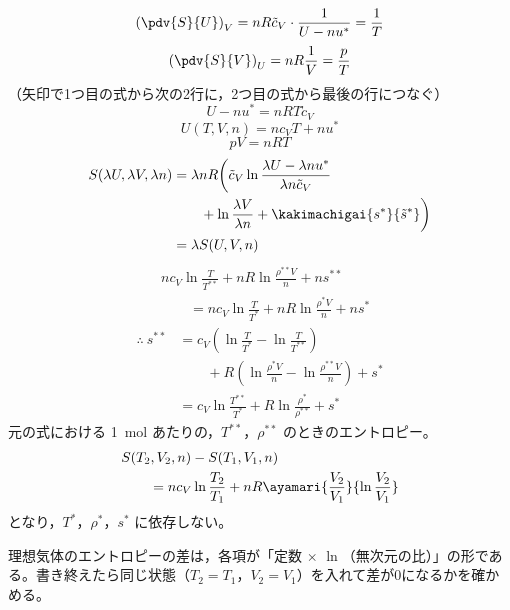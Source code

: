 \[ \left(\pdv{S}{U}\right)_{V}=nR\tilde{c}_{V}\cdot\frac{1}{U-nu^{*}}=\frac{1}{T} \]
\[ \left(\pdv{S}{V}\right)_{U}=nR\frac{1}{V}=\frac{p}{T} \]
（矢印で1つ目の式から次の2行に，2つ目の式から最後の行につなぐ）
\[ U-nu^{*}=nRT\tilde{c}_{V} \]
\[ U(T,V,n)=nc_{V}T+nu^{*} \]
\[ pV=nRT \]
\begin{align*}
S(\lambda U,\lambda V,\lambda n)&=\lambda nR\biggl(\tilde{c}_{V}\ln\frac{\lambda U-\lambda nu^{*}}{\lambda n\tilde{c}_{V}}\\
&\qquad+\ln\frac{\lambda V}{\lambda n}+\kakimachigai{s^{*}}{\tilde{s}^{*}}\biggr)\\
&=\lambda S(U,V,n)
\end{align*}
\begin{align*}
&nc_{V}\ln\frac{T}{T^{**}}+nR\ln\frac{\rho^{**}V}{n}+ns^{**}\\
&\qquad=nc_{V}\ln\frac{T}{T^{*}}+nR\ln\frac{\rho^{*}V}{n}+ns^{*}
\end{align*}
\begin{align*}
\therefore\ s^{**}&=c_{V}\left(\ln\frac{T}{T^{*}}-\ln\frac{T}{T^{**}}\right)\\
&\qquad+R\left(\ln\frac{\rho^{*}V}{n}-\ln\frac{\rho^{**}V}{n}\right)+s^{*}\\
&=c_{V}\ln\frac{T^{**}}{T^{*}}+R\ln\frac{\rho^{*}}{\rho^{**}}+s^{*}
\end{align*}
元の式における \qty{1}{\mole} あたりの，$T^{**}$，$\rho^{**}$ のときのエントロピー。
\begin{align*}
&S(T_{2},V_{2},n)-S(T_{1},V_{1},n)\\
&\qquad=nc_{V}\ln\frac{T_{2}}{T_{1}}+nR\ayamari{\frac{V_{2}}{V_{1}}}{\ln\frac{V_{2}}{V_{1}}}
\end{align*}
となり，$T^{*}$，$\rho^{*}$，$s^{*}$ に依存しない。
\item 理想気体のエントロピーの差は，各項が「定数 $\times$ $\ln$（無次元の比）」の形である。書き終えたら同じ状態（$T_{2}=T_{1}$，$V_{2}=V_{1}$）を入れて差が0になるかを確かめる。
